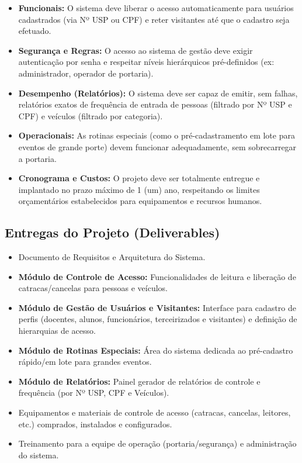 \documentclass[a4paper]{article}
\begin{document}
\begin{itemize}
    \item \textbf{Funcionais:} O sistema deve liberar o acesso automaticamente para usuários cadastrados (via Nº USP ou CPF) e reter visitantes até que o cadastro seja efetuado.
    \item \textbf{Segurança e Regras:} O acesso ao sistema de gestão deve exigir autenticação por senha e respeitar níveis hierárquicos pré-definidos (ex: administrador, operador de portaria).
    \item \textbf{Desempenho (Relatórios):} O sistema deve ser capaz de emitir, sem falhas, relatórios exatos de frequência de entrada de pessoas (filtrado por Nº USP e CPF) e veículos (filtrado por categoria).
    \item \textbf{Operacionais:} As rotinas especiais (como o pré-cadastramento em lote para eventos de grande porte) devem funcionar adequadamente, sem sobrecarregar a portaria.
    \item \textbf{Cronograma e Custos:} O projeto deve ser totalmente entregue e implantado no prazo máximo de 1 (um) ano, respeitando os limites orçamentários estabelecidos para equipamentos e recursos humanos.
\end{itemize}

\subsection{Entregas do Projeto (Deliverables)}

\begin{itemize}
    \item Documento de Requisitos e Arquitetura do Sistema.
    \item \textbf{Módulo de Controle de Acesso:} Funcionalidades de leitura e liberação de catracas/cancelas para pessoas e veículos.
    \item \textbf{Módulo de Gestão de Usuários e Visitantes:} Interface para cadastro de perfis (docentes, alunos, funcionários, terceirizados e visitantes) e definição de hierarquias de acesso.
    \item \textbf{Módulo de Rotinas Especiais:} Área do sistema dedicada ao pré-cadastro rápido/em lote para grandes eventos.
    \item \textbf{Módulo de Relatórios:} Painel gerador de relatórios de controle e frequência (por Nº USP, CPF e Veículos).
    \item Equipamentos e materiais de controle de acesso (catracas, cancelas, leitores, etc.) comprados, instalados e configurados.
    \item Treinamento para a equipe de operação (portaria/segurança) e administração do sistema.
\end{itemize}
\end{document}
